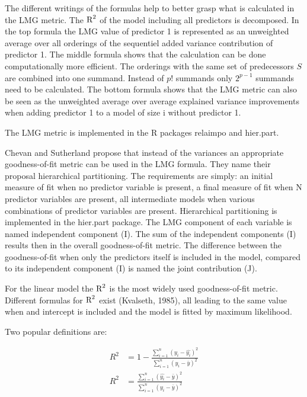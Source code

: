 \documentclass[11pt,a4paper,twoside]{book}
\begin{document}
   The different writings of the formulas help to better grasp what is calculated in the LMG metric. The $\text{R}^2$ of the model including all predictors is decomposed. In the top formula the LMG value of predictor 1 is represented as an unweighted average over all orderings of the sequentiel added variance contribution of predictor 1. The middle formula shows that the calculation can be  done computationally more efficient. The orderings with the same set of predecessors $S$ are combined into one summand. Instead of $p!$ summands only $2^{p-1}$ summands need to be calculated. The bottom formula shows that the LMG metric can also be seen as the unweighted average over average explained variance improvements when adding predictor 1 to a model of size i without predictor 1. 
   
The LMG metric is implemented in the R packages relaimpo and hier.part.

Chevan and Sutherland propose that instead of the variances an appropriate goodness-of-fit metric can be used in the LMG formula. They name their proposal hierarchical partitioning. The requirements are simply: an initial measure of fit when no predictor variable is present, a final measure of fit when N predictor variables are present, all intermediate models when various combinations of predictor variables are present. 
Hierarchical partitioning is implemented in the hier.part package. The LMG component of each variable is named independent component (I). The sum of the independent components (I) results then in the overall goodness-of-fit metric. The difference between the goodness-of-fit when only the predictors itself is included in the model, compared to its independent component (I) is named the joint contribution (J).  

For the linear model the $\text{R}^2$ is the most widely used goodness-of-fit metric. Different formulas for $\text{R}^2$ exist (Kvalseth, 1985), all leading to the same value when and intercept is included and the model is fitted by maximum likelihood. 

Two popular definitions are:
   
      \begin{align} 
     R^2 &= 1 - \frac{\sum_{i=1}^{n}(y_{i} - \hat{y_{i}})^2}{\sum_{i=1}^{n}(y_{i}-\bar{y})^2}   \label{eq:4}  \\
     R^2 &= \frac{\sum_{i=1}^{n}(\hat{y_{i}} - \bar{y})^2}{\sum_{i=1}^{n}(y_{i}-\bar{y})^2}   \label{eq:5} 
   \end{align} 
   
\end{document}
